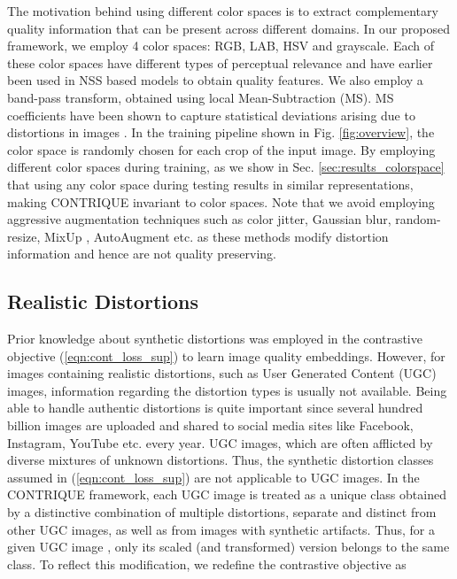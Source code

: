 \documentclass[journal]{IEEEtran}
\begin{document}
The motivation behind using different color spaces is to extract complementary quality information that can be present across different domains. In our proposed framework, we employ 4 color spaces: RGB, LAB, HSV and grayscale. Each of these color spaces have different types of perceptual relevance and have earlier been used in NSS based models \cite{ghadiyaram2017perceptual,tu2021rapique} to obtain quality features. We also employ a band-pass transform, obtained using local Mean-Subtraction (MS). MS coefficients have been shown to capture statistical deviations arising due to distortions in images \cite{bampis2017speed, bampis2018spatiotemporal,madhusudana2021st}. In the training pipeline shown in Fig. \ref{fig:overview}, the color space is randomly chosen for each crop of the input image. By employing different color spaces during training, as we show in Sec. \ref{sec:results_colorspace} that using any color space during testing results in similar representations, making CONTRIQUE invariant to color spaces. Note that we avoid employing aggressive augmentation techniques such as color jitter, Gaussian blur, random-resize, MixUp \cite{zhang2017mixup}, AutoAugment \cite{cubuk2019autoaugment} etc. as these methods modify distortion information and hence are not quality preserving.

\subsection{Realistic Distortions}
Prior knowledge about synthetic distortions was employed in the contrastive objective (\ref{eqn:cont_loss_sup}) to learn image quality embeddings. However, for images containing realistic distortions, such as User Generated Content (UGC) images, information regarding the distortion types is usually not available. Being able to handle authentic distortions is quite important since several hundred billion images are uploaded and shared to social media sites like Facebook, Instagram, YouTube etc. every year. UGC images, which are often afflicted by diverse mixtures of unknown distortions. Thus, the synthetic distortion classes assumed in (\ref{eqn:cont_loss_sup}) are not applicable to UGC images. In the CONTRIQUE framework, each UGC image is treated as a unique class obtained by a distinctive combination of multiple distortions, separate and distinct from other UGC images, as well as from images with synthetic artifacts. Thus, for a given UGC image , only its scaled (and transformed) version  belongs to the same class. To reflect this modification, we redefine the contrastive objective as 
\end{document}
